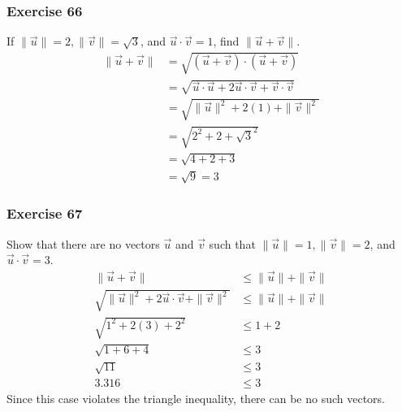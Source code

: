 \documentclass[letterpaper, 12pt]{math}
\begin{document}
\subsubsection*{Exercise 66}
If \( \|\vec{u}\| = 2, \|\vec{v}\| = \sqrt{3} \), and \( \vec{u}\cdot\vec{v} =
1 \), find \( \|\vec{u}+\vec{v}\| \).
\begin{align*}
  \|\vec{u}+\vec{v}\| &= \sqrt{(\vec{u}+\vec{v})\cdot(\vec{u}+\vec{v})} \\
  &= \sqrt{\vec{u}\cdot\vec{u}+2\vec{u}\cdot\vec{v}+\vec{v}\cdot\vec{v}} \\
  &= \sqrt{\|\vec{u}\|^2+2(1)+\|\vec{v}\|^2} \\
  &= \sqrt{2^2+2+\sqrt{3}^2} \\
  &= \sqrt{4+2+3} \\
  &= \sqrt{9} = 3
\end{align*}

\subsubsection*{Exercise 67}
Show that there are no vectors \( \vec{u} \) and \( \vec{v} \) such that
\( \|\vec{u}\| = 1, \|\vec{v}\| = 2 \), and \( \vec{u}\cdot\vec{v} = 3 \).
\begin{align*}
  \|\vec{u}+\vec{v}\| &\le \|\vec{u}\|+\|\vec{v}\| \\
  \sqrt{\|\vec{u}\|^2+2\vec{u}\cdot\vec{v}+\|\vec{v}\|^2} &\le
    \|\vec{u}\|+\|\vec{v}\| \\
  \sqrt{1^2+2(3)+2^2} &\le 1+2 \\
  \sqrt{1+6+4} &\le 3 \\
  \sqrt{11} &\le 3 \\
  3.316 &\le 3
\end{align*}
Since this case violates the triangle inequality, there can be no such vectors.
\end{document}
